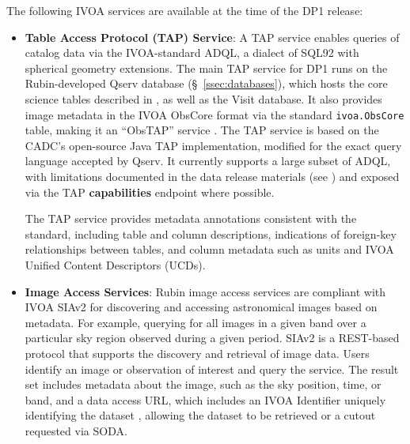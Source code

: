 The following \gls{IVOA} services are available at the time of the DP1 release:
\begin{itemize}
\vspace{0.1cm}
\item \textbf{Table Access Protocol (TAP) Service}: A TAP service \citep{2019ivoa.spec.0927D} enables queries of catalog data via the IVOA-standard \gls{ADQL}, a dialect of SQL92 with spherical geometry extensions.
The main \gls{TAP} service for \gls{DP1} runs on the Rubin-developed \gls{Qserv} database (\S~\ref{ssec:databases}), which hosts the core science tables described in , as well as the Visit database.
It also provides image metadata in the IVOA ObsCore format via the standard \texttt{ivoa.ObsCore} table, making it an ``ObsTAP'' service \citep[ObsTAP;][]{2017ivoa.spec.0509L}.
The TAP service is based on the \gls{CADC}'s open-source Java TAP implementation, modified for the exact query language accepted by Qserv.
It currently supports a large subset of ADQL, with limitations documented in the data release materials (see ) and exposed via the TAP \textbf{capabilities} endpoint where possible. 

The TAP service provides metadata annotations consistent with the standard, including table and column descriptions, indications of foreign-key relationships between tables, and column metadata such as units and \gls{IVOA} Unified Content Descriptors (UCDs).

\vspace{0.1cm}
\item \textbf{Image Access Services}: Rubin image access services are compliant with \gls{IVOA} SIAv2 \citep[Simple Image Access Protocol, version 2;][]{2025arXiv250100544J,2015ivoa.spec.1223D}
for discovering and accessing astronomical images based on \gls{metadata}.
For example, querying for all images in a given band over a particular sky region observed during a given period.
SIAv2 is a \gls{REST}-based protocol that supports the discovery and retrieval of image data.
Users identify an image or observation of interest and query the service.
The result set includes \gls{metadata} about the image, such as the sky position, time, or band, and a data access URL, which includes an IVOA Identifier uniquely identifying the dataset \citep{DMTN-302}, allowing the dataset to be retrieved or a cutout requested via \gls{SODA}.


\end{itemize}
